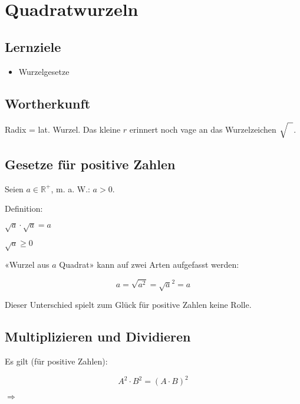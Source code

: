 \newpage
\section{Quadratwurzeln}\index{$\sqrt{\mathstrut{}\,}$}

\subsection*{Lernziele}

\begin{itemize}
\item Wurzelgesetze 
\end{itemize}

\subsection{Wortherkunft}
Radix = lat. Wurzel.
Das kleine $r$ erinnert noch vage an das Wurzelzeichen $\sqrt{\strut{}\ \ }$.

\subsection{Gesetze für positive Zahlen}
Seien $a \in \mathbb{R^+}$, m. a. W.: $a>0$.

Definition:

$\sqrt{a} \cdot \sqrt{a} = a$

$\sqrt{a} \ge 0$

«Wurzel aus $a$ Quadrat» kann auf zwei Arten aufgefasst werden:

$$a = \sqrt{a^2} = \sqrt{a}^2 = a$$

Dieser Unterschied spielt zum Glück für positive Zahlen keine Rolle.


\newpage
\subsection{Multiplizieren und Dividieren}
Es gilt (für positive Zahlen):

$$A^2\cdot B^2 = (A\cdot B)^2$$

$\Rightarrow$

